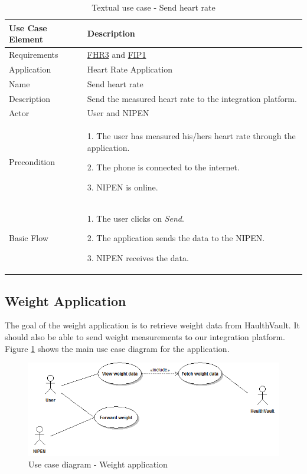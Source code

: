 \begin{table}[H]
\begin{center}
\begin{tabular}{ l | p{10cm} }
  \hline
  \textbf{Use Case Element} & \textbf{Description} \\ \hline\hline
  Requirements & \hyperref[table:reqheartrate]{FHR3} and \hyperref[table:reqip]{FIP1} \\ \hline
  Application & Heart Rate Application \\ \hline
  Name & Send heart rate \\ \hline
  Description & Send the measured heart rate to the integration platform. \\ \hline
  Actor & User and NIPEN \\ \hline
  Precondition &
    \par 1. The user has measured his/hers heart rate through the application.
    \par 2. The phone is connected to the internet.
    \par 3. NIPEN is online.
  \\ \hline
  Basic Flow & 
  	\par 1. The user clicks on \textit{Send}.
  	\par 2. The application sends the data to the NIPEN.
  	\par 3. NIPEN receives the data.
  \\ \hline
\end{tabular}
\end{center}
\caption{Textual use case - Send heart rate}
\label{table:use-case-send-heart-rate}
\end{table}

\subsection{Weight Application}

The goal of the weight application is to retrieve weight data from HaulthVault.
It should also be able to send weight measurements to our integration platform.
Figure \ref{figure:use-case-diagram-weight} shows the main use case diagram for the application.

\begin{figure}[H]
\centering
\includegraphics[scale=0.6]{../Figures/use-case-diagram-weight.png}
\caption{Use case diagram - Weight application}
\label{figure:use-case-diagram-weight}
\end{figure}

